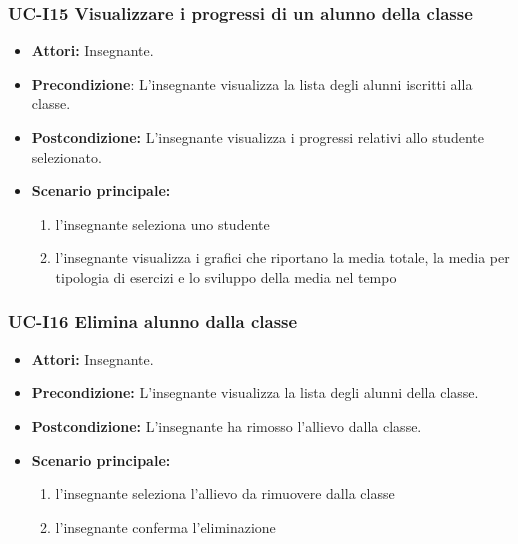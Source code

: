 \subsubsection{UC-I15 Visualizzare i progressi di un alunno della classe}
\begin{itemize}
	\item \textbf{Attori:} Insegnante.
	\item \textbf{Precondizione}: L'insegnante visualizza la lista degli alunni iscritti alla classe.
	\item \textbf{Postcondizione:} L'insegnante visualizza i progressi relativi allo studente selezionato.
	\item \textbf{Scenario principale:}
	\begin{enumerate}
		\item l'insegnante seleziona uno studente
		\item l'insegnante visualizza i grafici che riportano la media totale, la media per tipologia di esercizi e lo sviluppo della media nel tempo
	\end{enumerate}
\end{itemize}

\subsubsection{UC-I16 Elimina alunno dalla classe}		
\begin{itemize}
	\item \textbf{Attori:} Insegnante.
	\item \textbf{Precondizione:} L'insegnante visualizza la lista degli alunni della classe.
	\item \textbf{Postcondizione:} L'insegnante ha rimosso l'allievo dalla classe.
	\item \textbf{Scenario principale:}
	\begin{enumerate}
		\item l'insegnante seleziona l'allievo da rimuovere dalla classe
		\item l'insegnante conferma l'eliminazione
	\end{enumerate}	
\end{itemize}

